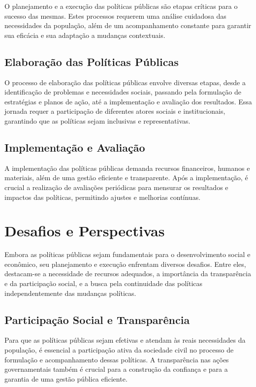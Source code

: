 \documentclass[
   article,       
   12pt,          
   oneside,       
   a4paper,       
   english,       
   brazil,        
   sumario=tradicional
   ]{abntex2}
\begin{document}
O planejamento e a execução das políticas públicas são etapas críticas para o sucesso das mesmas. Estes processos requerem uma análise cuidadosa das necessidades da população, além de um acompanhamento constante para garantir sua eficácia e sua adaptação a mudanças contextuais.

\subsection{Elaboração das Políticas Públicas}

O processo de elaboração das políticas públicas envolve diversas etapas, desde a identificação de problemas e necessidades sociais, passando pela formulação de estratégias e planos de ação, até a implementação e avaliação dos resultados. Essa jornada requer a participação de diferentes atores sociais e institucionais, garantindo que as políticas sejam inclusivas e representativas.

\subsection{Implementação e Avaliação}

A implementação das políticas públicas demanda recursos financeiros, humanos e materiais, além de uma gestão eficiente e transparente. Após a implementação, é crucial a realização de avaliações periódicas para mensurar os resultados e impactos das políticas, permitindo ajustes e melhorias contínuas.

\section{Desafios e Perspectivas}

Embora as políticas públicas sejam fundamentais para o desenvolvimento social e econômico, seu planejamento e execução enfrentam diversos desafios. Entre eles, destacam-se a necessidade de recursos adequados, a importância da transparência e da participação social, e a busca pela continuidade das políticas independentemente das mudanças políticas.

\subsection{Participação Social e Transparência}

Para que as políticas públicas sejam efetivas e atendam às reais necessidades da população, é essencial a participação ativa da sociedade civil no processo de formulação e acompanhamento dessas políticas. A transparência nas ações governamentais também é crucial para a construção da confiança e para a garantia de uma gestão pública eficiente.
\end{document}
